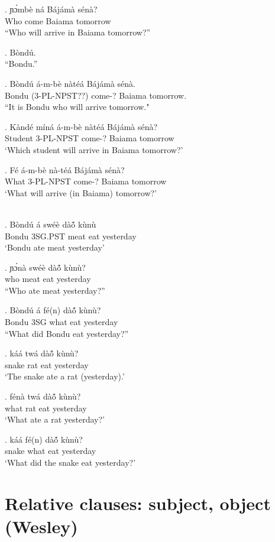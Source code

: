 \documentclass{assets/fieldnotes}
\begin{document}
\exg. ɲɔ́mbè ná Bájámà sénà?\\
Who come Baiama tomorrow\\
``Who will arrive in Baiama tomorrow?''

\ex. Bòndú.\\
``Bondu.''

\exg. Bòndú á-m-bè nàtéá Bájámà sénà.\\
Bondu (3-PL-NPST??) come-? Baiama tomorrow.\\
``It is Bondu who will arrive tomorrow."

\exg. Kàndé míná á-m-bè nàtéá Bájámà sénà?\\
Student 3-PL-NPST come-? Baiama tomorrow\\
`Which student will arrive in Baiama tomorrow?'

\exg. Fé á-m-bè nà-téá Bájámà sénà?\\
What 3-PL-NPST come-? Baiama tomorrow\\
`What will arrive (in Baiama) tomorrow?'

\\
\exg. Bòndú á swéè dàó̃ kùnù\\
Bondu 3SG.PST meat eat yesterday \\%
    `Bondu ate meat yesterday'

\exg. ɲɔ́nà swéè dàó̃ kùnù?\\
who meat eat yesterday\\
``Who ate meat yesterday?''

\exg. Bòndú á fé(n) dàó̃ kùnù?\\
Bondu 3SG what eat yesterday\\
``What did Bondu eat yesterday?''\\

\exg. káá twá dàó̃ kùnù?\\
snake rat eat yesterday\\
`The snake ate a rat (yesterday).'

\exg. fénà twá dàó̃ kùnù?\\
what rat eat yesterday\\
`What ate a rat yesterday?'

\exg. káá fé(n) dàó̃ kùnù?\\
snake what eat yesterday\\
`What did the snake eat yesterday?'


\section{Relative clauses: subject, object (Wesley)}
\end{document}
